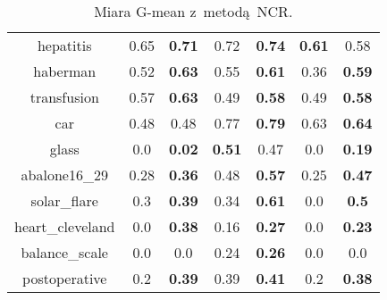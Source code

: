 \begin{table}[H]
\begin{center}
{\begin{tabular}{c|cccccc}
hepatitis&0.65&\textbf{0.71}&0.72&\textbf{0.74}&\textbf{0.61}&0.58\\%
haberman&0.52&\textbf{0.63}&0.55&\textbf{0.61}&0.36&\textbf{0.59}\\%
transfusion&0.57&\textbf{0.63}&0.49&\textbf{0.58}&0.49&\textbf{0.58}\\%
car&0.48&0.48&0.77&\textbf{0.79}&0.63&\textbf{0.64}\\%
glass&0.0&\textbf{0.02}&\textbf{0.51}&0.47&0.0&\textbf{0.19}\\%
abalone16\_29&0.28&\textbf{0.36}&0.48&\textbf{0.57}&0.25&\textbf{0.47}\\%
solar\_flare&0.3&\textbf{0.39}&0.34&\textbf{0.61}&0.0&\textbf{0.5}\\%
heart\_cleveland&0.0&\textbf{0.38}&0.16&\textbf{0.27}&0.0&\textbf{0.23}\\%
balance\_scale&0.0&0.0&0.24&\textbf{0.26}&0.0&0.0\\%
postoperative&0.2&\textbf{0.39}&0.39&\textbf{0.41}&0.2&\textbf{0.38}\\%
						\end{tabular}}
						\caption{Miara G-mean z~metodą NCR.}
						\label{gmeanncr}
					\end{center}
				\end{table}		
